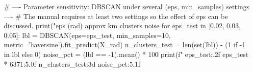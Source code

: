 \begin{codebox}[title={Parameter sensitivity: DBSCAN under several (eps, min\_samples) settings}]
# ---- Parameter sensitivity: DBSCAN under several (eps, min_samples) settings ----
# The manual requires at least two settings so the effect of eps can be discussed.
print("eps (rad)   approx km   clusters   noise %
for eps_test in [0.02, 0.03, 0.05]:
    lbl = DBSCAN(eps=eps_test, min_samples=10, metric='haversine').fit_predict(X_rad)
    n_clusters_test = len(set(lbl)) - (1 if -1 in lbl else 0)
    noise_pct = (lbl == -1).mean() * 100
    print(f"  {eps_test:.2f}       {eps_test * 6371:5.0f}      {n_clusters_test:3d}      {noise_pct:5.1f}%
\end{codebox}
